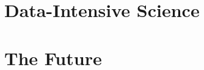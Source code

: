 \documentclass[11pt,oneside]{book}
\theoremstyle{definition}
\begin{document}




\part{Data-Intensive Science}
\label{part:data_science}





\part{The Future}
\label{part:future}

%

\appendix




\backmatter



\printindex

\printglossary[title=Glossary, type=\mainglossary]
\end{document}

